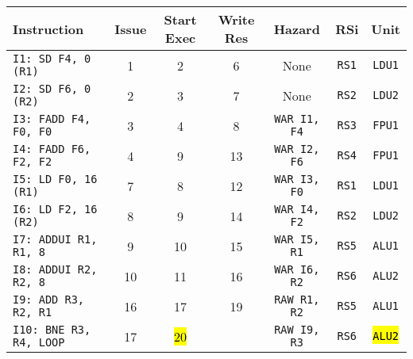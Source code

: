 \begin{enumerate}
    \begin{table}[!htp]
        \centering
        \begin{adjustbox}{width={\textwidth},totalheight={\textheight},keepaspectratio}
        \begin{tabular}{@{} l c c c c c c @{}}
            \toprule
            \textbf{Instruction} & \textbf{Issue} & \textbf{Start Exec} & \textbf{Write Res} & \textbf{Hazard} & \textbf{RSi} & \textbf{Unit} \\
            \midrule
            \texttt{I1: SD F4, 0 (R1)}      & 1 & 2 & 6 & None  & \texttt{RS1}   & \texttt{LDU1}  \\ [.5em]
            \texttt{I2: SD F6, 0 (R2)}      & 2 & 3 & 7 & None  & \texttt{RS2}   & \texttt{LDU2}  \\ [.5em]
            \texttt{I3: FADD F4, F0, F0}    & 3 & 4 & 8 & \texttt{WAR I1, F4}  & \texttt{RS3} & \texttt{FPU1} \\ [.5em]
            \texttt{I4: FADD F6, F2, F2}    & 4 & 9 & 13 & \texttt{WAR I2, F6} & \texttt{RS4} & \texttt{FPU1} \\ [.5em]
            \texttt{I5: LD F0, 16 (R1)}     & 7 & 8 & 12 & \texttt{WAR I3, F0} & \texttt{RS1} & \texttt{LDU1} \\ [.5em]
            \texttt{I6: LD F2, 16 (R2)}     & 8 & 9 & 14 & \texttt{WAR I4, F2} & \texttt{RS2} & \texttt{LDU2} \\ [.5em]
            \texttt{I7: ADDUI R1, R1, 8}    & 9 & 10 & 15 & \texttt{WAR I5, R1} & \texttt{RS5} & \texttt{ALU1} \\ [.5em]
            \texttt{I8: ADDUI R2, R2, 8}    & 10 & 11 & 16 & \texttt{WAR I6, R2} & \texttt{RS6} & \texttt{ALU2} \\ [.5em]
            \texttt{I9: ADD R3, R2, R1}     & 16 & 17 & 19 & \texttt{RAW R1, R2} & \texttt{RS5} & \texttt{ALU1} \\ [.5em]
            \texttt{I10: BNE R3, R4, LOOP}   & 17 & \hl{20} &   & \texttt{RAW I9, R3} & \texttt{RS6} & \hl{\texttt{ALU2}} \\
            \bottomrule
        \end{tabular}
        \end{adjustbox}
    \end{table}
    

\end{enumerate}
